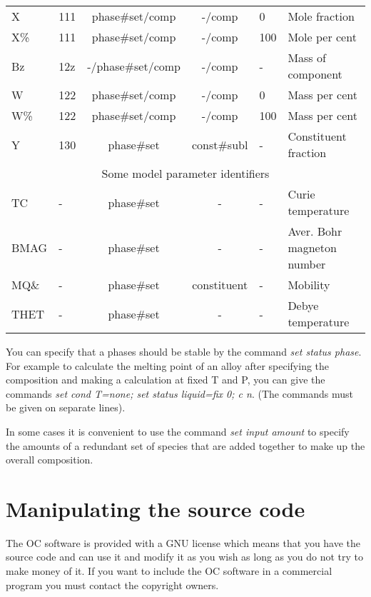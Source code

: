 \documentclass[12pt]{article}
\begin{document}
\begin{table}
\begin{tabular}{|llccll|}
X      & 111 & phase\#set/comp & -/comp & 0  & Mole fraction\\
X\%    & 111 & phase\#set/comp & -/comp & 100 & Mole per cent\\
Bz     & 12z & -/phase\#set/comp & -/comp & -  & Mass of component\\
W      & 122 & phase\#set/comp & -/comp & 0 & Mass per cent\\
W\%    & 122 & phase\#set/comp & -/comp & 100 & Mass per cent\\
Y      & 130 & phase\#set & const\#subl & -& Constituent fraction\\\hline
\multicolumn{6}{|c|}{Some model parameter identifiers}\\\hline
TC     & - & phase\#set & - & - & Curie temperature\\
BMAG   & - & phase\#set & - & - & Aver. Bohr magneton number\\
MQ\&   & - & phase\#set & constituent & - & Mobility\\
THET   & - & phase\#set & - & - & Debye temperature\\\hline
\end{tabular}
\end{table}

You can specify that a phases should be stable by the command {\em set
status phase}.  For example to calculate the melting point of an alloy
after specifying the composition and making a calculation at fixed T
and P, you can give the commands {\em set cond T=none; set status
liquid=fix 0; c n}.  (The commands must be given on separate lines).

In some cases it is convenient to use the command {\em set input
amount} to specify the amounts of a redundant set of species that are
added together to make up the overall composition.

\section{Manipulating the source code}

The OC software is provided with a GNU license which means that you
have the source code and can use it and modify it as you wish as long
as you do not try to make money of it.  If you want to include the OC
software in a commercial program you must contact the copyright
owners.
\end{document}
